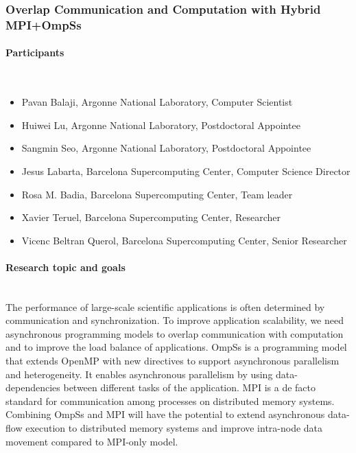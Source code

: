 \subsubsection{Overlap Communication and Computation with Hybrid MPI+OmpSs}
\label{sec.report.pb2} %

\paragraph{Participants}~\\
\begin{itemize}
  \item Pavan Balaji, Argonne National Laboratory, Computer Scientist
  \item Huiwei Lu, Argonne National Laboratory, Postdoctoral Appointee
  \item Sangmin Seo, Argonne National Laboratory, Postdoctoral Appointee
  \item Jesus Labarta, Barcelona Supercomputing Center, Computer Science Director
  \item Rosa M. Badia, Barcelona Supercomputing Center, Team leader
  \item Xavier Teruel, Barcelona Supercomputing Center, Researcher
  \item Vicenc Beltran Querol, Barcelona Supercomputing Center, Senior Researcher
\end{itemize}

\paragraph{Research topic and goals}~\\


The performance of large-scale scientific applications is often determined by
communication and synchronization. To improve application scalability, we need
asynchronous programming models to overlap communication with computation and
to improve the load balance of applications. OmpSs is a programming model that
extends OpenMP with new directives to support asynchronous parallelism and
heterogeneity. It enables asynchronous parallelism by using data-dependencies
between different tasks of the application. MPI is a de facto standard for
communication among processes on distributed memory systems. Combining OmpSs
and MPI will have the potential to extend asynchronous data-flow execution to
distributed memory systems and improve intra-node data movement compared to
MPI-only model.


